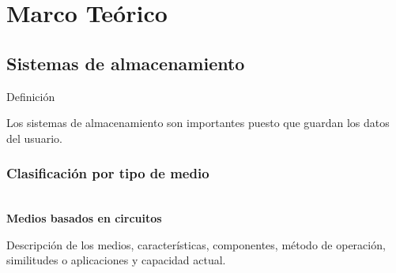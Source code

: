   \chapter{Marco Te\'{o}rico}
  \label{chap:cap1}
    \section {Sistemas de almacenamiento}
    
Definici\'{o}n

Los sistemas de almacenamiento son importantes puesto que guardan los datos del usuario.

\subsection {Clasificaci\'{o}n por tipo de medio}

\textbf{\\ Medios basados en circuitos \\}

Descripci\'{o}n de los medios, caracter\'{i}sticas, componentes, m\'{e}todo de operaci\'{o}n, similitudes o aplicaciones y capacidad actual.

